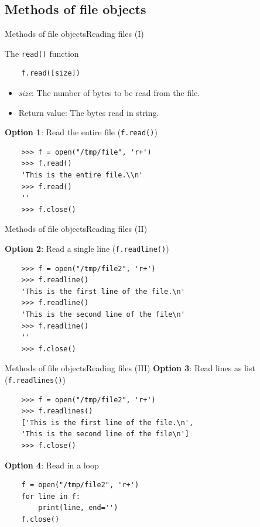 \documentclass[10pt,compress]{beamer} %
\begin{document}
\subsection{Methods of file objects}
\begin{frame}[fragile]{Methods of file objects}{Reading files (I)}
	\begin{block}{The \texttt{read()} function}
	\begin{verbatim}
	f.read([size])
	\end{verbatim}

	\vspace{-0.5cm}
	\begin{itemize}
	\item \textit{size}: The number of bytes to be read from the file.
	\item Return value: The bytes read in string.
	\end{itemize}
	\end{block}
\textbf{Option 1}: Read the entire file (\texttt{f.read()})
	\begin{verbatim}
	>>> f = open("/tmp/file", 'r+')
	>>> f.read()
	'This is the entire file.\\n'
	>>> f.read()
	''
	>>> f.close()
	\end{verbatim}
	
\end{frame}

\begin{frame}[fragile]{Methods of file objects}{Reading files (II)}
	

	\textbf{Option 2}: Read a single line (\texttt{f.readline()})
	\begin{verbatim}
	>>> f = open("/tmp/file2", 'r+')
	>>> f.readline()
	'This is the first line of the file.\n'
	>>> f.readline()
	'This is the second line of the file\n'
	>>> f.readline()
	''
	>>> f.close()
	\end{verbatim}

\end{frame}

\begin{frame}[fragile]{Methods of file objects}{Reading files (III)}
	\textbf{Option 3}: Read lines as list (\texttt{f.readlines()})
	\begin{verbatim}
	>>> f = open("/tmp/file2", 'r+')
	>>> f.readlines()
	['This is the first line of the file.\n',
	'This is the second line of the file\n']
	>>> f.close()
	\end{verbatim}

	\textbf{Option 4}: Read in a loop
	\begin{verbatim}
	f = open("/tmp/file2", 'r+')
	for line in f:
	    print(line, end='')
	f.close()
	\end{verbatim}
\end{frame}
\end{document}

